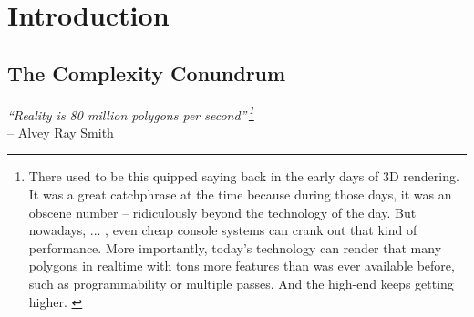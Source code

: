 \chapter{Introduction}
\label{introduction0}
\vspace{-0.25cm}
\section{The Complexity Conundrum}
\label{introduction1}

\begin{flushright}
\textit{``Reality is 80 million polygons per second''\,\footnote{ There used to be this quipped saying back in the early days of 3D rendering. It was a great catchphrase at the time because during those days, it was an obscene number -- ridiculously beyond the technology of the day. But nowadays, ... , even cheap console systems can crank out that kind of performance. More importantly, today's technology can render that many polygons in realtime with tons more features than was ever available before, such as programmability or multiple passes. And the high-end keeps getting higher. \citep[John Carmack, co-founder of id Software, cited in:][]{Kosak2005}}}\\
-- Alvey Ray Smith \citep[co-founder Pixar, cited in:][p.168]{Rheingold1991}
\end{flushright}

